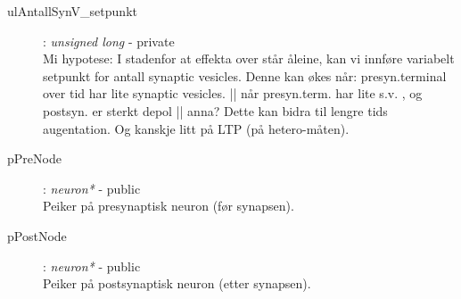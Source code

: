 \begin{description}
		\item[ulAntallSynV\_setpunkt] 			: 	\textit{unsigned long} 	- 	private \\
		Mi hypotese: I stadenfor at effekta over står åleine, kan vi innføre variabelt setpunkt for antall synaptic vesicles. Denne kan økes når:
		presyn.terminal over tid har lite synaptic vesicles. || når presyn.term. har lite s.v. , og postsyn. er sterkt depol || anna?
		Dette kan bidra til lengre tids augentation. Og kanskje litt på LTP (på hetero-måten).
		
		\item[pPreNode] 						: 	\textit{neuron*}  	-  	public \\
			Peiker på presynaptisk neuron (før synapsen).
		\item[pPostNode] 	 	 				: 	\textit{neuron*} 		-   	public \\
			Peiker på postsynaptisk neuron (etter synapsen).
	\end{description}



